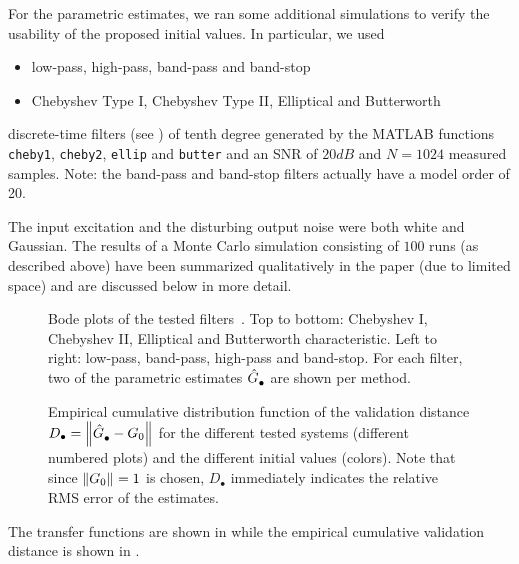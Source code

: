 For the parametric estimates, we ran some additional simulations to verify the usability of the proposed initial values.
In particular, we used
\begin{itemize}
  \item low-pass, high-pass, band-pass and band-stop 
  \item Chebyshev Type I, Chebyshev Type II, Elliptical and Butterworth
\end{itemize}
discrete-time filters (see ) of tenth degree generated by the MATLAB functions \texttt{cheby1}, \texttt{cheby2}, \texttt{ellip} and \texttt{butter} and an SNR of $20 \unit{dB}$ and $N=1024$ measured samples.
Note: the band-pass and band-stop filters actually have a model order of 20.

The input excitation and the disturbing output noise were both white and Gaussian.
The results of a Monte Carlo simulation consisting of $100$ runs (as described above) have been summarized qualitatively in the paper (due to limited space) and are discussed below in more detail.


\begin{figure}[p]
  \setlength{\figurewidth}{0.75\columnwidth}
  \setlength{\figureheight}{0.6\figurewidth}
  \centering
  
  \caption{Bode plots of the tested filters~. Top to bottom: Chebyshev I, Chebyshev II, Elliptical and Butterworth characteristic.
  Left to right: low-pass, band-pass, high-pass and band-stop.
  For each filter, two of the parametric estimates $\hat{G}_{\mathrm{\bullet}}^{\mathrm{}}$ are shown per method.
  }
  \label{fig:bodeplots}
\end{figure}

\begin{figure}[p]
  \setlength{\figurewidth}{0.75\columnwidth}
  \setlength{\figureheight}{0.6\figurewidth}
  \centering
  
  \caption{Empirical cumulative distribution function of the validation distance $D_{\bullet} = \left\| \hat{G}_{\mathrm{\bullet}}^{\mathrm{}} - G_0 \right\|_{}$ for the different tested systems (different numbered plots) and the different initial values (colors).
  Note that since $\left\| G_0 \right\|_{}=1$ is chosen, $D_{\bullet}$ immediately indicates the relative RMS error of the estimates.
  }
  \label{fig:distancesStress}
\end{figure}

The transfer functions are shown in  while the empirical cumulative validation distance is shown in .

